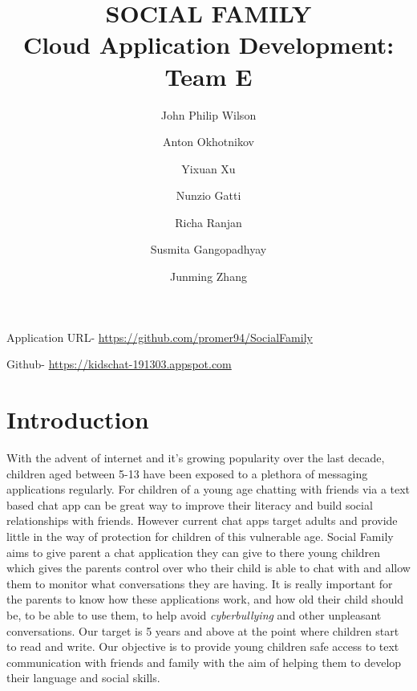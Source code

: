 \documentclass[a4paper,10pt]{article}
\title{SOCIAL FAMILY\\ Cloud Application Development: Team E}
\author{John Philip Wilson}
\author{Anton Okhotnikov}
\author{Yixuan Xu}
\author{Nunzio Gatti}
\author{Richa Ranjan}
\author{Susmita Gangopadhyay}
\author{Junming Zhang}
\affil{University of Southampton, MSc Data Science}
\begin{document}
\maketitle
Application URL- \href{https://github.com/promer94/SocialFamily}{https://github.com/promer94/SocialFamily} \par
Github- \href{https://kidschat-191303.appspot.com}{https://kidschat-191303.appspot.com}




\section{Introduction}
With the advent of internet and it's growing popularity over the last decade, children aged between 5-13 have been exposed to a plethora of messaging applications regularly. For children of a young age chatting with friends via a text based chat app can be great way to improve their literacy and build social relationships with friends.  However current chat apps target adults  and provide little in the way of protection for children of this vulnerable age.  Social Family aims to give parent a chat application they can give to there young children which gives the parents control over who their child is able to chat with and allow them to monitor what conversations they are having. It is really important for the parents to know how these applications work, and how old their child should be, to be able to use them, to help avoid \textit{cyberbullying} and other unpleasant conversations. Our target is 5 years and above at the point where children start to read and write. Our objective is to provide young children safe access to text communication with friends and family with the aim of helping them to develop their language and social skills.
\end{document}
